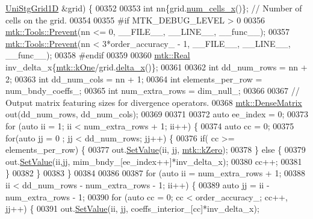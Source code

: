 \begin{DoxyCode}
{{      \hyperlink{classmtk_1_1UniStgGrid1D}{UniStgGrid1D} &grid) \{
00352 
00353   \textcolor{keywordtype}{int} nn\{grid.\hyperlink{classmtk_1_1UniStgGrid1D_af1b3729d8afa07be5b2775ed68015b80}{num\_cells\_x}()\}; \textcolor{comment}{// Number of cells on the grid.}
00354 
00355 \textcolor{preprocessor}{  #if MTK\_DEBUG\_LEVEL > 0}
00356   \hyperlink{classmtk_1_1Tools_afe5bb096309258e2e72503fd7b41c7e0}{mtk::Tools::Prevent}(nn <= 0, \_\_FILE\_\_, \_\_LINE\_\_, \_\_func\_\_);
00357   \hyperlink{classmtk_1_1Tools_afe5bb096309258e2e72503fd7b41c7e0}{mtk::Tools::Prevent}(nn < 3*order\_accuracy\_ - 1, \_\_FILE\_\_, \_\_LINE\_\_, \_\_func\_\_);
00358 \textcolor{preprocessor}{  #endif}
00359 
00360   \hyperlink{group__c01-roots_gac080bbbf5cbb5502c9f00405f894857d}{mtk::Real} inv\_delta\_x\{\hyperlink{group__c01-roots_ga26407c24d43b6b95480943340d285c71}{mtk::kOne}/grid.\hyperlink{classmtk_1_1UniStgGrid1D_a6e7173b01241632cf509496d66b9f74c}{delta\_x}()\};
00361 
00362   \textcolor{keywordtype}{int} dd\_num\_rows = nn + 2;
00363   \textcolor{keywordtype}{int} dd\_num\_cols = nn + 1;
00364   \textcolor{keywordtype}{int} elements\_per\_row = num\_bndy\_coeffs\_;
00365   \textcolor{keywordtype}{int} num\_extra\_rows = dim\_null\_;
00366 
00367   \textcolor{comment}{// Output matrix featuring sizes for divergence operators.}
00368   \hyperlink{classmtk_1_1DenseMatrix}{mtk::DenseMatrix} out(dd\_num\_rows, dd\_num\_cols);
00369 
00371 
00372   \textcolor{keyword}{auto} ee\_index = 0;
00373   \textcolor{keywordflow}{for} (\textcolor{keyword}{auto} ii = 1; ii < num\_extra\_rows + 1; ii++) \{
00374     \textcolor{keyword}{auto} cc = 0;
00375     \textcolor{keywordflow}{for}(\textcolor{keyword}{auto} jj = 0 ; jj < dd\_num\_rows; jj++) \{
00376       \textcolor{keywordflow}{if}( cc >= elements\_per\_row) \{
00377         out.\hyperlink{classmtk_1_1DenseMatrix_ae0f873a6d3a734da467cafb817da64ae}{SetValue}(ii, jj, \hyperlink{group__c01-roots_ga59a451a5fae30d59649bcda274fea271}{mtk::kZero});
00378       \} \textcolor{keywordflow}{else} \{
00379         out.\hyperlink{classmtk_1_1DenseMatrix_ae0f873a6d3a734da467cafb817da64ae}{SetValue}(ii,jj, mim\_bndy\_[ee\_index++]*inv\_delta\_x);
00380         cc++;
00381       \}
00382     \}
00383   \}
00384 
00386 
00387   \textcolor{keywordflow}{for} (\textcolor{keyword}{auto} ii = num\_extra\_rows + 1;
00388        ii < dd\_num\_rows - num\_extra\_rows - 1; ii++) \{
00389     \textcolor{keyword}{auto} jj = ii - num\_extra\_rows - 1;
00390     \textcolor{keywordflow}{for} (\textcolor{keyword}{auto} cc = 0; cc < order\_accuracy\_; cc++, jj++) \{
00391       out.\hyperlink{classmtk_1_1DenseMatrix_ae0f873a6d3a734da467cafb817da64ae}{SetValue}(ii, jj, coeffs\_interior\_[cc]*inv\_delta\_x);
}}
\end{DoxyCode}

